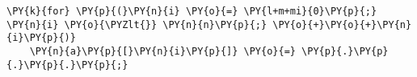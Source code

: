 \begin{Verbatim}[commandchars=\\\{\},codes={\catcode`\$=3\catcode`\^=7\catcode`\_=8}]
\PY{k}{for} \PY{p}{(}\PY{n}{i} \PY{o}{=} \PY{l+m+mi}{0}\PY{p}{;} \PY{n}{i} \PY{o}{\PYZlt{}} \PY{n}{n}\PY{p}{;} \PY{o}{+}\PY{o}{+}\PY{n}{i}\PY{p}{)}
    \PY{n}{a}\PY{p}{[}\PY{n}{i}\PY{p}{]} \PY{o}{=} \PY{p}{.}\PY{p}{.}\PY{p}{.}\PY{p}{;}
\end{Verbatim}
